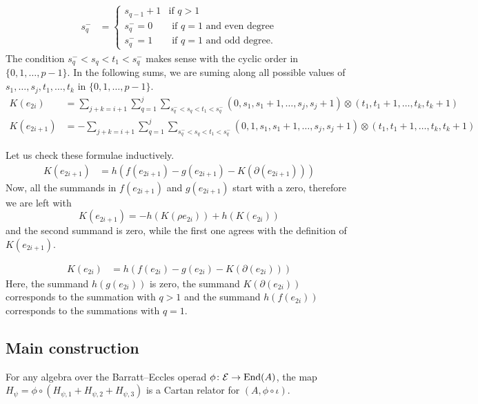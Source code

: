 \begin{align*}
    s_q^- &= \begin{cases}s_{q-1}+1 & \text{if $q>1$}\\
    s_q^- = 0 & \text{ if $q=1$ and even degree} \\
    s_q^- = 1 &\text{ if $q=1$ and odd degree.}
    \end{cases}
\end{align*} 
The condition $s_q^-<s_q<t_1<s_q^-$ makes sense with the cyclic order in $\{0,1,\ldots,p-1\}$. In the following sums, we are suming along all possible values of $s_1,\ldots,s_j,t_1,\ldots,t_k$ in $\{0,1,\ldots,p-1\}$.
\begin{align*}
K(e_{2i}) &= \sum_{j+k = i+1}{\sum_{q=1}^j{\sum_{s_q^-<s_q<t_1<s_q^-}{(0,s_1,s_1+1,\ldots,s_j,s_j+1)\otimes(t_1,t_1+1,\ldots,t_k,t_k+1)}}} \\ 
K(e_{2i+1}) &= -\sum_{j+k = i+1}{\sum_{q=1}^j{\sum_{s_q^-<s_q<t_1<s_q^-}{(0,1,s_1,s_1+1,\ldots,s_j,s_j+1)\otimes(t_1,t_1+1,\ldots,t_k,t_k+1)}}}
\end{align*}


Let us check these formulae inductively. 
\begin{align*}
K(e_{2i+1}) &= h(f(e_{2i+1})-g(e_{2i+1})-K(\partial(e_{2i+1})))
\end{align*}
Now, all the summands in $f(e_{2i+1})$ and $g(e_{2i+1})$ start with a zero, therefore we are left with
\[K(e_{2i+1}) = -h(K(\rho e_{2i}))+h(K(e_{2i}))\]
and the second summand is zero, while the first one agrees with the definition of $K(e_{2i+1})$.

\begin{align*}
K(e_{2i}) &= h(f(e_{2i})-g(e_{2i})-K(\partial(e_{2i})))
\end{align*}
Here, the summand $h(g(e_{2i}))$ is zero, the summand $K(\partial(e_{2i}))$ corresponds to the summation with $q>1$ and the summand $h(f(e_{2i}))$ corresponds to the summations with $q=1$.



\subsection{Main construction}

\begin{theorem}
	For any algebra over the Barratt--Eccles operad $\phi \colon \mathcal{E} \to \mathrm{End}(A)$, the map $H_\psi = \phi \circ (H_{\psi,1} + H_{\psi,2} + H_{\psi,3})$ is a Cartan relator for $(A,\phi\circ\iota)$.
\end{theorem}

